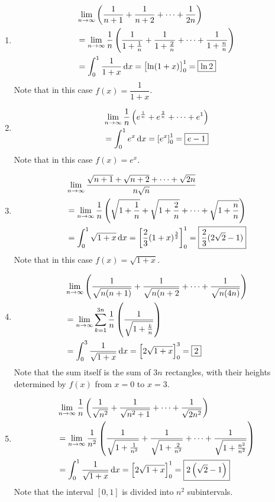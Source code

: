 \begin{solution} \ 
\begin{enumerate}[label=(\alph*)]
\item \begin{align*}
&\lim_{n\to\infty}\left(\frac{1}{n+1}+\frac{1}{n+2}+\cdots+\frac{1}{2n}\right) \\
&= \lim_{n\to\infty}\frac{1}{n}\left(\frac{1}{1+\frac{1}{n}}+\frac{1}{1+\frac{2}{n}}+\cdots+\frac{1}{1+\frac{n}{n}}\right) \\
&= \int_0^1\frac{1}{1+x}\dd{x}=\left[\ln(1+x)\right]_0^1=\boxed{\ln2}
\end{align*}
Note that in this case $f(x)=\dfrac{1}{1+x}$.

\item \begin{align*}
&\lim_{n\to\infty}\frac{1}{n}\left(e^\frac{1}{n}+e^\frac{2}{n}+\cdots+e^1\right) \\
&= \int_0^1e^x\dd{x}=\left[e^x\right]_0^1=\boxed{e-1}
\end{align*}
Note that in this case $f(x)=e^x$.

\item \begin{align*}
&\lim_{n\to\infty}\frac{\sqrt{n+1}+\sqrt{n+2}+\cdots+\sqrt{2n}}{n\sqrt{n}} \\
&= \lim_{n\to\infty}\frac{1}{n}\left(\sqrt{1+\frac{1}{n}}+\sqrt{1+\frac{2}{n}}+\cdots+\sqrt{1+\frac{n}{n}}\right) \\
&= \int_0^1\sqrt{1+x}\dd{x}=\left[\frac{2}{3}(1+x)^\frac{3}{2}\right]_0^1=\boxed{\frac{2}{3}(2\sqrt{2}-1)}
\end{align*}
Note that in this case $f(x)=\sqrt{1+x}$.

\item \begin{align*}
&\lim_{n\to\infty}\left(\frac{1}{\sqrt{n(n+1)}}+\frac{1}{\sqrt{n(n+2}}+\cdots+\frac{1}{\sqrt{n(4n)}}\right) \\
&= \lim_{n\to\infty}\sum_{k=1}^{3n}\frac{1}{n}\left(\frac{1}{\sqrt{1+\frac{k}{n}}}\right) \\
&= \int_0^3\frac{1}{\sqrt{1+x}}\dd{x}=\left[2\sqrt{1+x}\right]_0^3=\boxed{2}
\end{align*}
Note that the sum itself is the sum of $3n$ rectangles, with their heights determined by $f(x)$ from $x=0$ to $x=3$.

\item \begin{align*}
&\lim_{n\to\infty}\frac{1}{n}\left(\frac{1}{\sqrt{n^2}}+\frac{1}{\sqrt{n^2+1}}+\cdots+\frac{1}{\sqrt{2n^2}}\right) \\
&= \lim_{n\to\infty}\frac{1}{n^2}\left(\frac{1}{\sqrt{1+\frac{1}{n^2}}}+\frac{1}{\sqrt{1+\frac{2}{n^2}}}+\cdots+\frac{1}{\sqrt{1+\frac{n^2}{n^2}}}\right) \\
&= \int_0^1\frac{1}{\sqrt{1+x}}\dd{x}=\left[2\sqrt{1+x}\right]_0^1=\boxed{2\left(\sqrt{2}-1\right)}
\end{align*}
Note that the interval $[0,1]$ is divided into $n^2$ subintervals.
\end{enumerate}
\end{solution}

